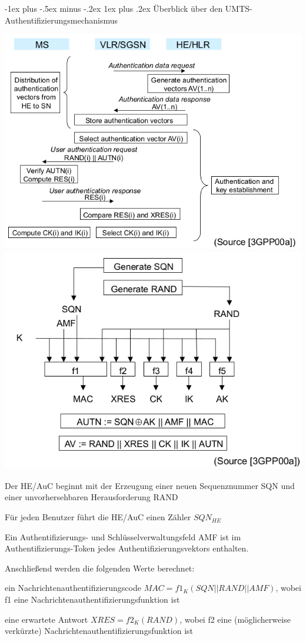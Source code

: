 \documentclass[a4paper]{article}
\makeatletter
\renewcommand{\subsubsection}{\@startsection{subsubsection}{3}{0mm}%
 {-1ex plus -.5ex minus -.2ex}%
 {1ex plus .2ex}%
 {\normalfont\small\bfseries}}
\makeatother
\begin{document}
\begin{multicols}{3}
      \subsubsection{Überblick über den UMTS-Authentifizierungsmechanismus}
      \begin{itemize*}
            \item \includegraphics[width=.45\linewidth]{Assets/NetworkSecurity-umts-authentication-mechanism.png}
            \includegraphics[width=.45\linewidth]{Assets/NetworkSecurity-umts-authentication-vectors.png}
            \begin{itemize*}
                  \item Der HE/AuC beginnt mit der Erzeugung einer neuen Sequenznummer SQN und einer unvorhersehbaren Herausforderung RAND
                  \begin{itemize*}
                        \item Für jeden Benutzer führt die HE/AuC einen Zähler $SQN_{HE}$
                  \end{itemize*}
                  \item Ein Authentifizierungs- und Schlüsselverwaltungsfeld AMF ist im Authentifizierungs-Token jedes Authentifizierungsvektors enthalten.
                  \item Anschließend werden die folgenden Werte berechnet:
                  \begin{itemize*}
                        \item ein Nachrichtenauthentifizierungscode $MAC = f1_K(SQN || RAND || AMF)$, wobei f1 eine Nachrichtenauthentifizierungsfunktion ist
                        \item eine erwartete Antwort $XRES = f2_K(RAND)$, wobei f2 eine (möglicherweise verkürzte) Nachrichtenauthentifizierungsfunktion ist

\end{itemize*}
\end{itemize*}
\end{itemize*}
\end{multicols}
\end{document}
